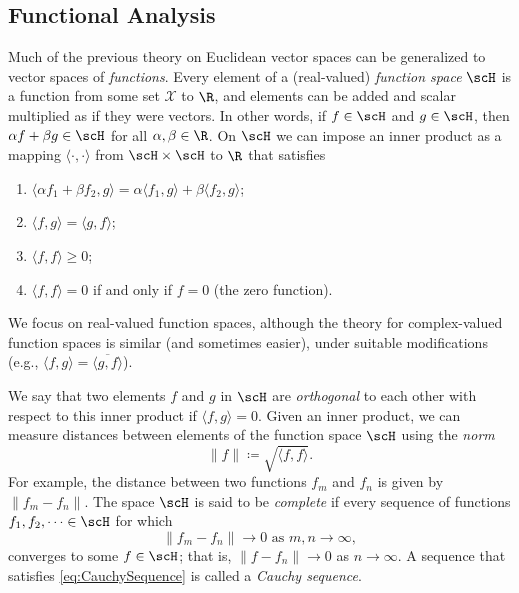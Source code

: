 \subsection{Functional Analysis}
Much of the previous theory on Euclidean vector spaces can be generalized to vector spaces of \textit{functions}. Every element of a (real-valued) \textit{function space} $\scH$ is a function from some set $\mathcal{X}$ to $\R$, and elements can be added and scalar multiplied as if they were vectors. In other words, if $f \in \scH$ and $g \in \scH$, then $\alpha f + \beta g \in \scH$ for all $\alpha, \beta \in \R$. On $\scH$ we can impose an inner product as a mapping $\langle \cdot, \cdot \rangle$ from $\scH \times \scH$ to $\R$ that satisfies
\begin{enumerate}
	\item $\langle \alpha f_1 + \beta f_2, g \rangle = \alpha \langle f_1, g \rangle + \beta \langle f_2, g \rangle$;
	\item $\langle f, g \rangle = \langle g, f \rangle$;
	\item $\langle f, f \rangle \ge 0$;
	\item $\langle f, f \rangle = 0$ if and only if $f = 0$ (the zero function).
\end{enumerate}
We focus on real-valued function spaces, although the theory for complex-valued function spaces is similar (and sometimes easier), under suitable modifications (e.g., $\langle f, g \rangle = \overline{\langle g, f \rangle}$).

We say that two elements $f$ and $g$ in $\scH$ are \textit{orthogonal} to each other with respect to this inner product if $\langle f, g \rangle = 0$. Given an inner product, we can measure distances between elements of the function space $\scH$ using the \textit{norm}
\begin{equation*}
	\|f\| \coloneqq \sqrt{\langle f, f \rangle}.
\end{equation*}
For example, the distance between two functions $f_m$ and $f_n$ is given by $\|f_m - f_n\|$. The space $\scH$ is said to be \textit{complete} if every sequence of functions $f_1, f_2, \dots \in \scH$ for which
\begin{equation}
	\|f_m - f_n\| \to 0 \text{ as } m, n \to \infty, \label{eq:CauchySequence}
\end{equation}
converges to some $f \in \scH$; that is, $\|f - f_n\| \to 0$ as $n \to \infty$. A sequence that satisfies \eqref{eq:CauchySequence} is called a \textit{Cauchy sequence}.

